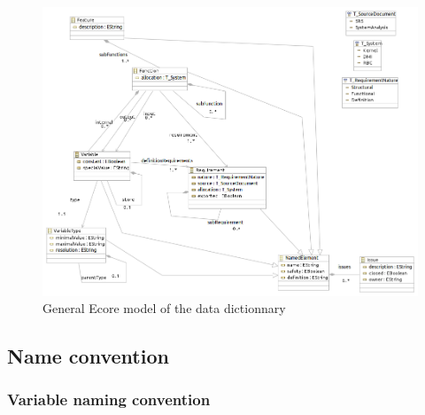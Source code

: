 \begin{figure}[ht]
  \centering
  \includegraphics[width=\textwidth]{DataModel/datadictionary.png}
  \caption{General Ecore model of the data dictionnary}
  \label{fig:links}
\end{figure}

\subsection{Name convention}
\label{sec:naming}


\subsubsection{Variable naming convention}

